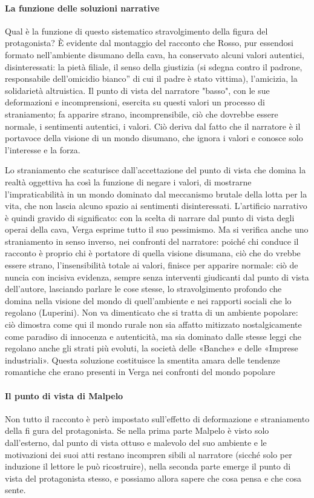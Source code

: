 \documentclass{book}
\newcounter{mar}
\begin{document}
\paragraph{La funzione delle soluzioni narrative} Qual è la funzione di questo sistematico stravolgimento della figura del protagonista? È evidente dal montaggio del racconto che Rosso, pur essendosi formato nell'ambiente disumano della cava, ha conservato alcuni valori autentici, disinteressati: la pietà filiale, il senso della giustizia (si sdegna contro il padrone, responsabile dell'omicidio bianco” di cui il padre è stato vittima), l'amicizia, la solidarietà altruistica. Il punto di vista del narratore "basso", con le sue deformazioni e incomprensioni, esercita su questi valori un processo di straniamento; fa apparire strano, incomprensibile, ciò che dovrebbe essere normale, i sentimenti autentici, i valori. Ciò deriva dal fatto che il narratore è il portavoce della visione di un mondo disumano, che ignora i valori e conosce solo l'interesse e la forza.

Lo straniamento che scaturisce dall'accettazione del punto di vista che domina la realtà oggettiva ha così la funzione di negare i valori, di mostrarne l'impraticabilità in un mondo dominato dal meccanismo brutale della lotta per la vita, che non lascia alcuno spazio ai sentimenti disinteressati. L'artificio narrativo è quindi gravido di significato: con la scelta di narrare dal punto di vista degli operai della cava, Verga esprime tutto il suo pessimismo. Ma si verifica anche uno straniamento in senso inverso, nei confronti del narratore: poiché chi conduce il racconto è proprio chi è portatore di quella visione disumana, ciò che do vrebbe essere strano, l'insensibilità totale ai valori, finisce per apparire normale: ciò de nuncia con incisiva evidenza, sempre senza interventi giudicanti dal punto di vista dell'autore, lasciando parlare le cose stesse, lo stravolgimento profondo che domina nella visione del mondo di quell'ambiente e nei rapporti sociali che lo regolano (Luperini). Non va dimenticato che si tratta di un ambiente popolare: ciò dimostra come qui il mondo rurale non sia affatto mitizzato nostalgicamente come paradiso di innocenza e autenticità, ma sia dominato dalle stesse leggi che regolano anche gli strati più evoluti, la società delle «Banche» e delle «Imprese industriali». Questa soluzione costituisce la smentita amara delle tendenze romantiche che erano presenti in Verga nei confronti del mondo popolare

\paragraph{Il punto di vista di Malpelo} Non tutto il racconto è però impostato sull'effetto di deformazione e straniamento della fi gura del protagonista. Se nella prima parte Malpelo è visto solo dall'esterno, dal punto di vista ottuso e malevolo del suo ambiente e le motivazioni dei suoi atti restano incompren sibili al narratore (sicché solo per induzione il lettore le può ricostruire), nella seconda parte emerge il punto di vista del protagonista stesso, e possiamo allora sapere che cosa pensa e che cosa sente.
\end{document}
